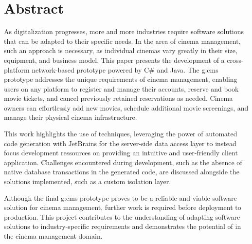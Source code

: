 \chapter{Abstract}

As digitalization progresses, more and more industries require software solutions that can be adapted to their specific needs. In the area of cinema management, such an approach is necessary, as individual cinemas vary greatly in their size, equipment, and business model. This paper presents the development of a cross-platform network-based  prototype powered by C\# and Java. The \gls{g:cms} prototype addresses the unique requirements of cinema management, enabling users on any platform to register and manage their accounts, reserve and book movie tickets, and cancel previously retained reservations as needed. Cinema owners can effortlessly add new movies, schedule additional movie screenings, and manage their physical cinema infrastructure.

\vspace{.1cm}
\hspace{-.6cm}This work highlights the use of  techniques, leveraging the power of automated code generation with JetBrains  for the server-side data access layer to instead focus development ressources on providing an intuitive and user-friendly client application. Challenges encountered during development, such as the absence of native database transactions in the generated code, are discussed alongside the solutions implemented, such as a custom isolation layer. 

\vspace{.1cm}
\hspace{-.6cm}Although the final \gls{g:cms} prototype proves to be a reliable and viable software solution for cinema management, further work is required before deployment to production. This project contributes to the understanding of adapting software solutions to industry-specific requirements and demonstrates the potential of  in the cinema management domain.